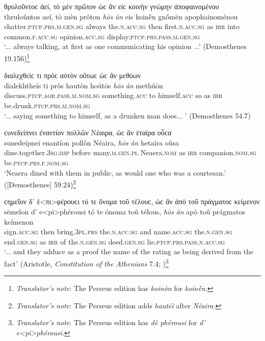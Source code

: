 \begin{exe}
\ex θρυλοῦντοϲ ἀεί, τὸ μὲν πρῶτον ὡϲ ἂν εἰϲ κοινὴν γνώμην ἀποφαινομένου\\
\gll thruloûntos aeí, tò mèn prôton \emph{hōs} \emph{àn} eis koinḕn gnṓmēn apophainoménou\\
chatter.\textsc{ptcp.prs.m.gen.sg} always the.\textsc{n.acc.sg} then first.\textsc{n.acc.sg} as \textsc{irr} into common.\textsc{f.acc.sg} opinion.\textsc{acc.sg} display.\textsc{ptcp.prs.pass.m.gen.sg}\\
\trans `... always talking, at first as one communicating his opinion ...' (Demosthenes 19.156)\footnote{\emph{Translator's note}: The Perseus edition has \textit{koinòn} for \textit{koinḕn}.}
\label{hosan47}
\end{exe}

\begin{exe}
\ex διαλεχθείϲ τι πρὸϲ αὑτὸν οὕτωϲ ὡϲ ἂν μεθύων\\
\gll dialekhtheís ti pròs hautòn hoútōs \emph{hōs} \emph{àn} methúōn\\
discuss.\textsc{ptcp.aor.pass.m.nom.sg} something.\textsc{acc} to himself.\textsc{acc} so as \textsc{irr} be.drunk.\textsc{ptcp.prs.m.nom.sg}\\
\trans `... saying something to himself, as a drunken man does... ' (Demosthenes 54.7)
\label{hosan48}
\end{exe}

\begin{exe}
\ex ϲυνεδείπνει ἐναντίον πολλῶν Νέαιρα, ὡϲ ἂν ἑταίρα οὖϲα\\
\gll sunedeípnei enantíon pollôn Néaira, \emph{hōs} \emph{àn} hetaíra oûsa\\
dine.together.\textsc{3sg.imp} before many.\textsc{m.gen.pl} Neaera.\textsc{nom} as \textsc{irr} companion.\textsc{nom.sg} be.\textsc{ptcp.prs.f.nom.sg}\\
\trans `Neaera dined with them in public, as would one who was a courtesan.' ({[}Demosthenes{]} 59.24)\footnote{\emph{Translator's note}: The Perseus edition adds \textit{hautēì} after \textit{Néaira}.}
\label{hosan49}
\end{exe}

\begin{exe}
\ex ϲημεῖον δ᾽ ἐ\textless{}πι\textgreater{}φέρουϲι τό τε ὄνομα τοῦ τέλουϲ, ὡϲ ἂν ἀπὸ τοῦ πράγματοϲ κείμενον\\
\gll sēmeîon d' e\textless{}pi\textgreater{}phérousi tó te ónoma toû télous, \emph{hōs} \emph{àn} apò toû prágmatos keímenon\\
sign.\textsc{acc.sg} then bring.\textsc{3pl.prs} the.\textsc{n.acc.sg} and name.\textsc{acc.sg} the.\textsc{n.gen.sg} end.\textsc{gen.sg} as \textsc{irr} of the.\textsc{n.gen.sg} deed.\textsc{gen.sg} lie.\textsc{ptcp.prs.pass.n.acc.sg}\\
\newpage
\trans `... and they adduce as a proof the name of the rating as being derived from the fact' (Aristotle, \textit{Constitution of the Athenians} 7.4; \citealp[19, line 12]{Kenyon1891})\footnote{\emph{Translator's note}: The Perseus edition has \textit{dè phérousi} for \textit{d' e\textless{}pi\textgreater{}phérousi}.}
\label{hosan50}
\end{exe}

